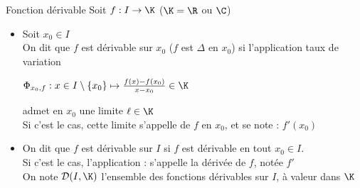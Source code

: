 \documentclass[12pt,a4paper]{report}
\begin{document}
\begin{definition}{Fonction dérivable}{}
Soit $f:I \rightarrow \K$ ($\K = \R$ ou $\C$)
\begin{itemize}
    \item Soit $x_0 \in I$\\
    On dit que $f$ est dérivable sur $x_0$ ($f$ est $\Delta$ en $x_0$) si l'application taux de variation 
    \begin{center}
        $\Phi_{x_0, f} : x \in I\setminus \lbrace x_0 \rbrace \mapsto \frac{f(x)-f(x_0)}{x-x_0} \in \K$ 
    \end{center}
    admet en $x_0$ une limite  $\ell \in \K$\\
    Si c'est le cas, cette limite s'appelle  de $f$ en $x_0$, et se note : $f'(x_0)$
    
    \item On dit que $f$ est dérivable sur $I$ si $f$ est dérivable en tout $x_0 \in I$. \\
    Si c'est le cas, l'application :  s'appelle la dérivée de $f$, notée $f'$\\
    On note $\mathcal{D} (I, \K)$ l'ensemble des fonctions dérivables sur $I$, à valeur dans $\K$
\end{itemize}
\end{definition}

\begin{remarque}


\end{remarque}
\end{document}
